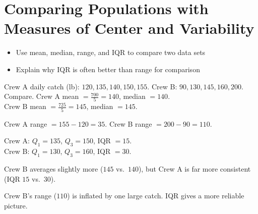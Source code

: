 \section{Comparing Populations with Measures of Center and Variability}

\begin{stepGoal}
\begin{itemize}
    \item Use mean, median, range, and IQR to compare two data sets
    \item Explain why IQR is often better than range for comparison
\end{itemize}
\end{stepGoal}

\begin{stepVocabBox}
\end{stepVocabBox}

\begin{stepsCard}
\end{stepsCard}

\begin{stepExample}{Crew A daily catch (lb): $120, 135, 140, 150, 155$. Crew B: $90, 130, 145, 160, 200$. Compare.}
     Crew A mean $= \frac{700}{5} = 140$, median $= 140$.\\
    Crew B mean $= \frac{725}{5} = 145$, median $= 145$.

     Crew A range $= 155 - 120 = 35$. Crew B range $= 200 - 90 = 110$.

     Crew A: $Q_1 = 135$, $Q_3 = 150$, IQR $= 15$.\\
    Crew B: $Q_1 = 130$, $Q_3 = 160$, IQR $= 30$.

     Crew B averages slightly more ($145$ vs.\ $140$), but Crew A is far more consistent (IQR $15$ vs.\ $30$).

     Crew B's range ($110$) is inflated by one large catch. IQR gives a more reliable picture.
\end{stepExample}

